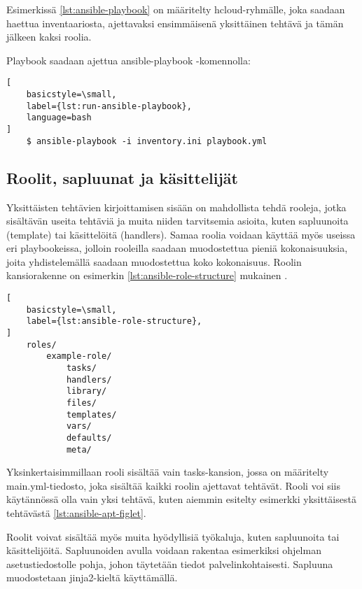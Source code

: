 

Esimerkissä \ref{lst:ansible-playbook} on määritelty hcloud-ryhmälle, joka
saadaan haettua inventaariosta, ajettavaksi ensimmäisenä yksittäinen tehtävä
ja tämän jälkeen kaksi roolia.

Playbook saadaan ajettua ansible-playbook -komennolla:

\begin{lstlisting}[
    basicstyle=\small,
    label={lst:run-ansible-playbook},
    language=bash
]
    $ ansible-playbook -i inventory.ini playbook.yml
\end{lstlisting}

\subsection{Roolit, sapluunat ja käsittelijät}

Yksittäisten tehtävien kirjoittamisen sisään on mahdollista tehdä rooleja,
jotka sisältävän useita tehtäviä ja muita niiden tarvitsemia asioita, kuten
sapluunoita (template) tai käsittelöitä (handlers). Samaa roolia voidaan
käyttää myös useissa eri playbookeissa, jolloin rooleilla saadaan muodostettua
pieniä kokonaisuuksia, joita yhdistelemällä saadaan muodostettua koko
kokonaisuus. \parencite{JamesFreeman2020PA2} Roolin kansiorakenne on esimerkin
\ref{lst:ansible-role-structure} mukainen \parencite{AnsibleDocs}.

\begin{lstlisting}[
    basicstyle=\small,
    label={lst:ansible-role-structure},
]
    roles/
        example-role/
            tasks/
            handlers/
            library/
            files/
            templates/
            vars/
            defaults/
            meta/
\end{lstlisting}

Yksinkertaisimmillaan rooli sisältää vain tasks-kansion, jossa on määritelty
main.yml-tiedosto, joka sisältää kaikki roolin ajettavat tehtävät. Rooli
voi siis käytännössä olla vain yksi tehtävä, kuten aiemmin esitelty esimerkki
yksittäisestä tehtävästä \ref{lst:ansible-apt-figlet}.

Roolit voivat sisältää myös muita hyödyllisiä työkaluja, kuten sapluunoita tai
käsittelijöitä. Sapluunoiden avulla voidaan rakentaa esimerkiksi ohjelman
asetustiedostolle pohja, johon täytetään tiedot palvelinkohtaisesti. Sapluuna
muodostetaan jinja2-kieltä käyttämällä. \parencite{JamesFreeman2020PA2}

